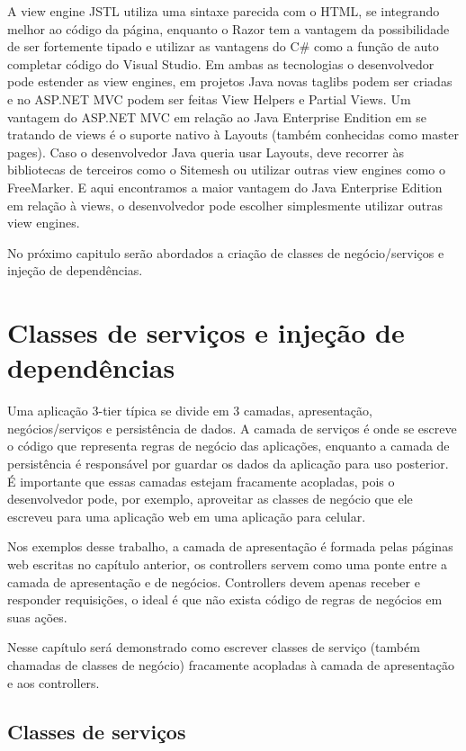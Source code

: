 \documentclass[a4paper,12pt]{article}
\begin{document}
A view engine JSTL utiliza uma sintaxe parecida com o HTML, se integrando melhor ao código da página, enquanto o Razor tem a vantagem da possibilidade de ser fortemente tipado e utilizar as vantagens do C\# como a função de auto completar código do Visual Studio. Em ambas as tecnologias o desenvolvedor pode estender as view engines, em projetos Java novas taglibs podem ser criadas e no ASP.NET MVC podem ser feitas View Helpers e Partial Views. Um vantagem do ASP.NET MVC em relação ao Java Enterprise Endition em se tratando de views é o suporte nativo à Layouts (também conhecidas como master pages). Caso o desenvolvedor Java queria usar Layouts, deve recorrer às bibliotecas de terceiros como o Sitemesh ou utilizar outras view engines como o FreeMarker. E aqui encontramos a maior vantagem do Java Enterprise Edition em relação à views, o desenvolvedor pode escolher simplesmente utilizar outras view engines.

No próximo capitulo serão abordados a criação de classes de negócio/serviços e injeção de dependências. 

\newpage
\section{Classes de serviços e injeção de dependências}

Uma aplicação 3-tier típica se divide em 3 camadas, apresentação, negócios/serviços e persistência de dados. A camada de serviços é onde se escreve o código que representa regras de negócio das aplicações, enquanto a camada de persistência é responsável por guardar os dados da aplicação para uso posterior. É importante que essas camadas estejam fracamente acopladas, pois o desenvolvedor pode, por exemplo, aproveitar as classes de negócio que ele escreveu para uma aplicação web em uma aplicação para celular.

Nos exemplos desse trabalho, a camada de apresentação é formada pelas páginas web escritas no capítulo anterior, os controllers servem como uma ponte entre a camada de apresentação e de negócios. Controllers devem apenas receber e responder requisições, o ideal é que não exista código de regras de negócios em suas ações.

Nesse capítulo será demonstrado como escrever classes de serviço (também chamadas de classes de negócio) fracamente acopladas à camada de apresentação e aos controllers. 

\subsection{Classes de serviços}
\end{document}
